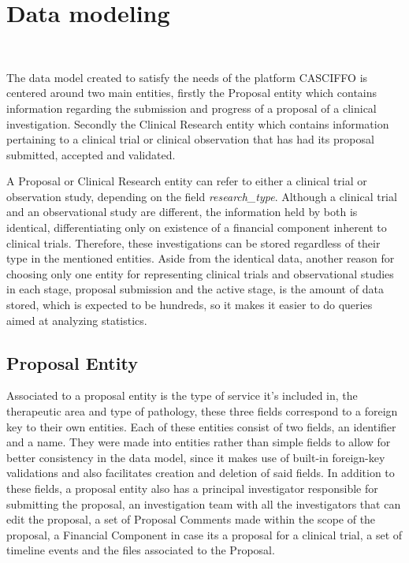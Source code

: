 \section{Data modeling}~\label{sec:data-model}

The data model created to satisfy the needs of the platform CASCIFFO is centered around two main entities, firstly the Proposal entity which contains information regarding the submission and progress of a proposal of a clinical investigation. Secondly the Clinical Research entity which contains information pertaining to a clinical trial or clinical observation that has had its proposal submitted, accepted and validated.

A Proposal or Clinical Research entity can refer to either a clinical trial or observation study, depending on the field \textit{research\_type}. Although a clinical trial and an observational study are different, the information held by both is identical, differentiating only on existence of a financial component inherent to clinical trials. Therefore, these investigations can be stored regardless of their type in the mentioned entities. Aside from the identical data, another reason for choosing only one entity for representing clinical trials and observational studies in each stage, proposal submission and the active stage, is the amount of data stored, which is expected to be hundreds, so it makes it easier to do queries aimed at analyzing statistics.


\subsection{Proposal Entity}
Associated to a proposal entity is the type of service it's included in, the therapeutic area and type of pathology, these three fields correspond to a foreign key to their own entities. Each of these entities consist of two fields, an identifier and a name. They were made into entities rather than simple fields to allow for better consistency in the data model, since it makes use of built-in foreign-key validations and also facilitates creation and deletion of said fields. In addition to these fields, a proposal entity also has a principal investigator responsible for submitting the proposal, an investigation team with all the investigators that can edit the proposal, a set of Proposal Comments made within the scope of the proposal, a Financial Component in case its a proposal for a clinical trial, a set of timeline events and the files associated to the Proposal. 



